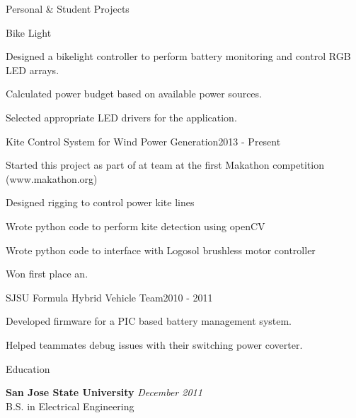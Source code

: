 \documentclass{resume} %
\begin{document}
\pagebreak[3]
\begin{rSection}{Personal \& Student Projects}

\begin{rProject}{Bike Light}{}
\item Designed a bikelight controller to perform battery monitoring and control RGB LED arrays.
\item Calculated power budget based on available power sources.
\item Selected appropriate LED drivers for the application.
\end{rProject}

\begin{rProject}{Kite Control System for Wind Power Generation}{2013 - Present}
\item Started this project as part of at team at the first Makathon competition (www.makathon.org)
\item Designed rigging to control power kite lines 
\item Wrote python code to perform kite detection using openCV
\item Wrote python code to interface with Logosol brushless motor controller
\item Won first place an.
\end{rProject}

\begin{rProject}{SJSU Formula Hybrid Vehicle Team}{2010 - 2011}
\item Developed firmware for a PIC based battery management system.
\item Helped teammates debug issues with their switching power coverter.
\end{rProject}

\end{rSection}

\pagebreak[3]
\begin{rSection}{Education}

{\bf San Jose State University} \hfill {\em December 2011} \\ 
B.S. in Electrical Engineering \\

\end{rSection}





\end{document}
